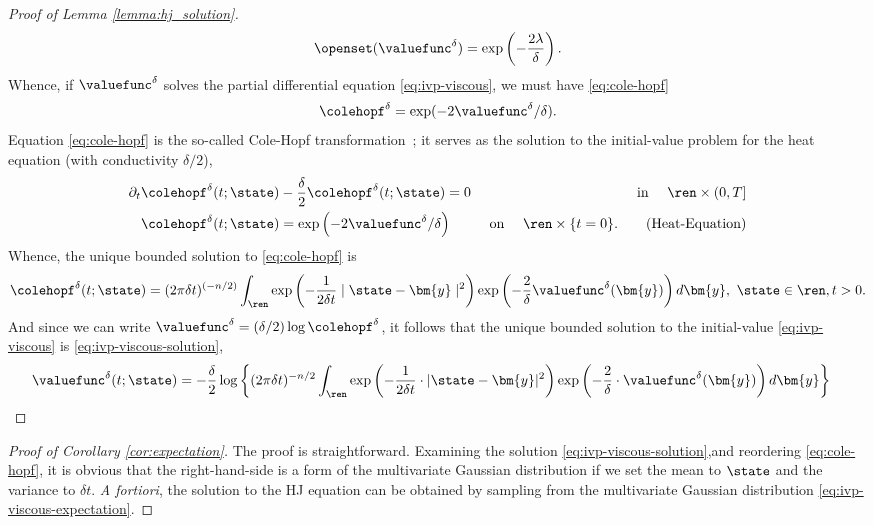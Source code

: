 \begin{proof}[Proof of Lemma \ref{lemma:hj_solution}]
\begin{align}
 	\openset(\valuefunc^\delta) = \exp\left(-\frac{2 \lambda}{\delta}\right). 
 	\label{eq:linear_trans}
 \end{align}
%
 Whence, if $\valuefunc^\delta$ solves the partial differential equation \eqref{eq:ivp-viscous}, we must have \eqref{eq:cole-hopf} \ie 
%
\begin{align}
	\colehopf^\delta = \exp(-2\valuefunc^\delta/\delta).
\end{align}
Equation \eqref{eq:cole-hopf} is the so-called Cole-Hopf transformation~\citet[\S 4.4.1]{EvansPDEBook}; it serves as the solution to the initial-value problem for the heat equation (with conductivity $\delta/2$), 
%
\begin{align}
	\partial_t \colehopf^\delta(t; \state) &- \dfrac{\delta}{2} \colehopf^\delta(t; \state) = 0  &\text{ in } \quad \ren \times (0, T] \nonumber \\
	\colehopf^\delta(t; \state) &= \exp\left({-2\valuefunc^\delta}/{\delta}\right)  & \text{ on } \quad \ren \times \{t=0\}. %
	\label{eq:Heat-Equation}
	\tag{Heat-Equation}
\end{align}
%
Whence, the unique bounded solution to \eqref{eq:cole-hopf} is
%
\begin{align}
\colehopf^\delta(t; \state) = (2 \pi \delta t )^{(-n/2)} \int_{\ren} \exp \left(-\frac{1}{2 \delta t} \mid \state - \bm{y} \mid^2\right) \exp \left(-\frac{2}{\delta}\valuefunc^\delta(\bm{y})\right) d\bm{y}, \,\, \state \in \ren, t > 0. 
\end{align} 
%
And since we can write $\valuefunc^\delta = (\delta/2) \log \colehopf^\delta$, it follows that the unique bounded solution to the initial-value \eqref{eq:ivp-viscous} is \eqref{eq:ivp-viscous-solution},\ie 
%
\begin{align}
	\valuefunc^\delta(t; \state) &= -\frac{\delta}{2} \log \bigg\{(2\pi\delta t)^{-n/2}\int_{\ren} \exp \left(-\frac{1}{2\delta t}\cdot |\state-\bm{y}|^2\right) \exp \left(-\frac{2}{\delta}\cdot \valuefunc^\delta(\bm{y})\right) d\bm{y} \bigg\}
\end{align}
%
\end{proof}


\begin{proof}[Proof of Corollary \ref{cor:expectation}]
	The proof is straightforward. Examining the solution \eqref{eq:ivp-viscous-solution},and reordering \eqref{eq:cole-hopf}, it is obvious that the right-hand-side is a form of the multivariate Gaussian distribution if we set the mean to $\state$ and the variance to $\delta t$. \textit{A fortiori}, the solution to the HJ equation can be obtained by sampling from the multivariate Gaussian distribution \eqref{eq:ivp-viscous-expectation}.
\end{proof}

